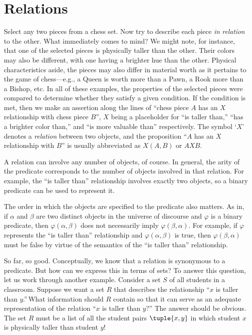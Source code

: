 \section{Relations}
Select any two pieces from a chess set. Now try to describe each piece \emph{in relation} to the other.
What immediately comes to mind?
We might note, for instance, that one of the selected pieces is physically taller than the other.
Their colors may also be different, with one having a brighter hue than the other. Physical characteristics aside,
the pieces may also differ in material worth as it pertains to the game of chess---e.g., a Queen is worth more than a Pawn, a Rook
more than a Bishop, etc. In all of these examples, the properties of the selected pieces were compared to determine whether
they satisfy a given condition. If the condition is met, then we make an assertion along the lines of ``chess piece \( A \) has an
\( X \) relationship with chess piece \( B \)'', \( X \) being a placeholder for ``is taller than,'' ``has a brighter
color than,'' and ``is more valuable than'' respectively.
The symbol `\( X \)' denotes a \emph{relation} between two objects,
and the proposition ``\( A \) has an \( X \) relationship with \( B \)'' is usually abbreviated as \( X(A,B) \) or \( AXB \).


\noindent
A relation can involve any number of objects, of course.
In general, the arity of the predicate corresponds to the number of objects involved in that relation.
For example, the ``is taller than'' relationship involves exactly two objects,
so a binary predicate can be used to represent it.

\vspace{0.3cm}
\noindent
The order in which the objects are specified to the predicate also matters.
As in, if \( \alpha \) and \( \beta \) are two distinct
objects in the universe of discourse and \( \varphi \) is a binary predicate,
then \( \varphi(\alpha, \beta) \) does not necessarily imply \( \varphi(\beta,\alpha) \).
For example, if \( \varphi \) represents the ``is taller than'' relationship and \( \varphi(\alpha,\beta) \)
is true, then \( \varphi(\beta,\alpha) \) must be false by virtue of the semantics of the ``is taller than''
relationship.

\vspace{0.3cm}
\noindent
So far, so good.
Conceptually, we know that a relation is synonymous to a predicate.
But how can we express this in terms of sets? To answer
this question, let us work through another example.
Consider a set \( S \) of all students in a classroom.
Suppose we want a set \( R \) that describes the
relationship ``\( x \) is taller than \( y \).''\,What information should
\( R \) contain so that it can serve as an adequate representation of the relation
``\( x \) is taller than \( y \)?'' The answer should be obvious. The set
\( R \) must be a list of all the student pairs \( \tuple{x,y} \)
in which student \( x \) is physically taller than student \( y \)!

